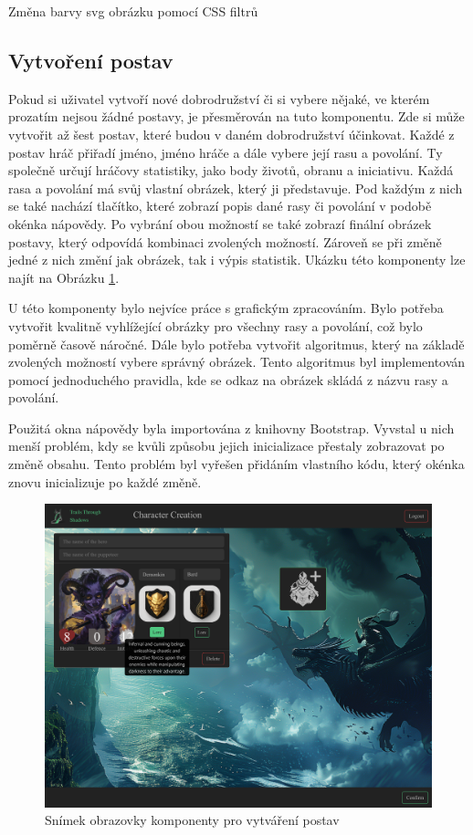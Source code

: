 \begin{listing}[H]
  \inputminted[breaklines]{css}{resources/code/svg_color.css}
  \caption{Změna barvy svg obrázku pomocí CSS filtrů}
  \label{code:svg_filter}
\end{listing}

\subsection{Vytvoření postav}
Pokud si uživatel vytvoří nové dobrodružství či si vybere nějaké, ve kterém prozatím nejsou žádné postavy, je přesměrován na tuto komponentu. Zde si může vytvořit až šest postav, které budou v daném dobrodružství účinkovat. Každé z postav hráč přiřadí jméno, jméno hráče a dále vybere její rasu a povolání. Ty společně určují hráčovy statistiky, jako body životů, obranu a iniciativu. Každá rasa a povolání má svůj vlastní obrázek, který ji představuje. Pod každým z nich se také nachází tlačítko, které zobrazí popis dané rasy či povolání v podobě okénka nápovědy. Po vybrání obou možností se také zobrazí finální obrázek postavy, který odpovídá kombinaci zvolených možností. Zároveň se při změně jedné z nich změní jak obrázek, tak i výpis statistik. Ukázku této komponenty lze najít na Obrázku \ref{fig:character-creation}.

U této komponenty bylo nejvíce práce s grafickým zpracováním. Bylo potřeba vytvořit kvalitně vyhlížející obrázky pro všechny rasy a povolání, což bylo poměrně časově náročné. Dále bylo potřeba vytvořit algoritmus, který na základě zvolených možností vybere správný obrázek. Tento algoritmus byl implementován pomocí jednoduchého pravidla, kde se odkaz na obrázek skládá z názvu rasy a povolání.

Použitá okna nápovědy byla importována z knihovny Bootstrap. Vyvstal u nich menší problém, kdy se kvůli způsobu jejich inicializace přestaly zobrazovat po změně obsahu. Tento problém byl vyřešen přidáním vlastního kódu, který okénka znovu inicializuje po každé změně.

\begin{figure}[H]
  \centering
  \includegraphics[width=.95\textwidth]{resources/figures/TTS-Charracter Creation.png}
  \caption{Snímek obrazovky komponenty pro vytváření postav}
  \label{fig:character-creation}
\end{figure}

